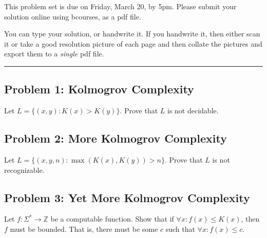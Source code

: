 \documentclass{article}
\begin{document}


This problem set is due on Friday, March 20, by 5pm. Please submit your solution online using bcourses,
as a pdf file. 

You can type your solution, or handwrite it. If you handwrite it, then either
scan it or take a good resolution picture of each page and then collate the pictures
and export them to a {\em single} pdf file.

\bigskip

\hrule


\subsection*{Problem 1: Kolmogrov Complexity}
Let $L = \{(x,y) : K(x) > K(y)\}$. Prove that $L$ is not decidable.

    \subsection*{Problem 2: More Kolmogrov Complexity}
Let $L = \{(x,y,n) : \max(K(x), K(y)) > n\}$. Prove that $L$ is not recognizable.
    
    \subsection*{Problem 3: Yet More Kolmogrov Complexity}
Let $f:\Sigma^* \rightarrow \mathbb{Z}$ be a computable function.
    Show that if $\forall x: f(x) \leq K(x)$, then $f$ must be bounded.
    That is, there must be some $c$ such that $\forall x: f(x) \leq c$.
\end{document}
